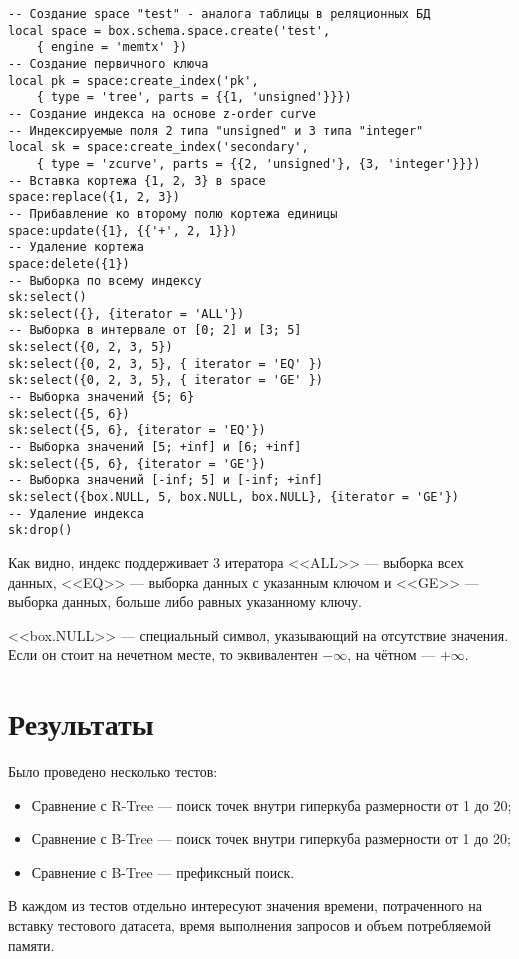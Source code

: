 \begin{lstlisting}
-- Создание space "test" - аналога таблицы в реляционных БД
local space = box.schema.space.create('test',
	{ engine = 'memtx' })
-- Создание первичного ключа
local pk = space:create_index('pk', 
	{ type = 'tree', parts = {{1, 'unsigned'}}})
-- Создание индекса на основе z-order curve
-- Индексируемые поля 2 типа "unsigned" и 3 типа "integer"
local sk = space:create_index('secondary',
	{ type = 'zcurve', parts = {{2, 'unsigned'}, {3, 'integer'}}})
-- Вставка кортежа {1, 2, 3} в space
space:replace({1, 2, 3})
-- Прибавление ко второму полю кортежа единицы
space:update({1}, {{'+', 2, 1}})
-- Удаление кортежа
space:delete({1})
-- Выборка по всему индексу
sk:select()
sk:select({}, {iterator = 'ALL'})
-- Выборка в интервале от [0; 2] и [3; 5]
sk:select({0, 2, 3, 5})
sk:select({0, 2, 3, 5}, { iterator = 'EQ' })
sk:select({0, 2, 3, 5}, { iterator = 'GE' })
-- Выборка значений {5; 6}
sk:select({5, 6})
sk:select({5, 6}, {iterator = 'EQ'})
-- Выборка значений [5; +inf] и [6; +inf]
sk:select({5, 6}, {iterator = 'GE'})
-- Выборка значений [-inf; 5] и [-inf; +inf]
sk:select({box.NULL, 5, box.NULL, box.NULL}, {iterator = 'GE'})
-- Удаление индекса
sk:drop()
\end{lstlisting}
Как видно, индекс поддерживает 3 итератора <<ALL>> --- выборка всех данных,
<<EQ>> --- выборка данных с указанным ключом и <<GE>> --- выборка данных, больше либо равных указанному ключу.

<<box.NULL>> --- специальный символ, указывающий на отсутствие значения. Если он стоит на нечетном месте, то эквивалентен $-\infty$, на чётном --- $+\infty$.

\chapter{Результаты} \label{chapt4}
Было проведено несколько тестов:
\begin{itemize}
	\item Сравнение с R-Tree --- поиск точек внутри гиперкуба
	размерности от 1 до 20;
	\item Сравнение с B-Tree --- поиск точек внутри гиперкуба
	размерности от 1 до 20;
	\item Сравнение с B-Tree --- префиксный поиск.
\end{itemize}

В каждом из тестов отдельно интересуют значения времени, потраченного на вставку тестового датасета, время выполнения запросов
и объем потребляемой памяти.

